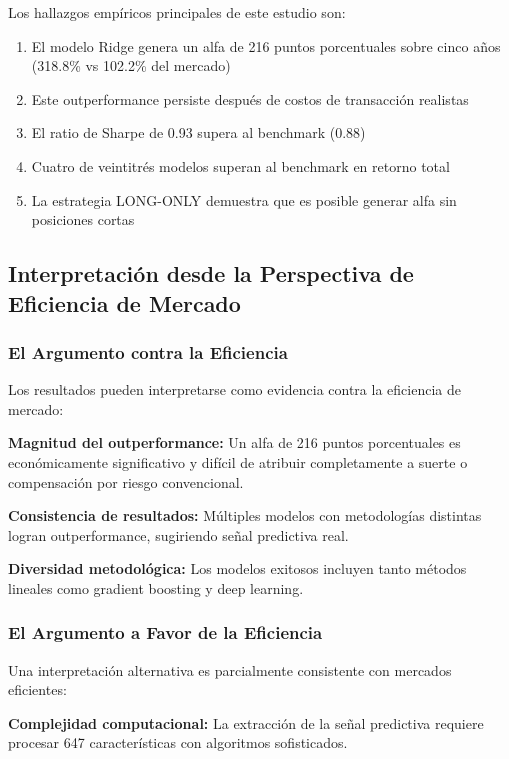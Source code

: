 \documentclass[11pt,a4paper]{article}
\begin{document}
Los hallazgos emp\'iricos principales de este estudio son:

\begin{enumerate}[noitemsep]
    \item El modelo Ridge genera un alfa de 216 puntos porcentuales sobre cinco a\~nos (318.8\% vs 102.2\% del mercado)
    \item Este outperformance persiste despu\'es de costos de transacci\'on realistas
    \item El ratio de Sharpe de 0.93 supera al benchmark (0.88)
    \item Cuatro de veintitr\'es modelos superan al benchmark en retorno total
    \item La estrategia LONG-ONLY demuestra que es posible generar alfa sin posiciones cortas
\end{enumerate}

\subsection{Interpretaci\'on desde la Perspectiva de Eficiencia de Mercado}

\subsubsection{El Argumento contra la Eficiencia}

Los resultados pueden interpretarse como evidencia contra la eficiencia de mercado:

\textbf{Magnitud del outperformance:} Un alfa de 216 puntos porcentuales es econ\'omicamente significativo y dif\'icil de atribuir completamente a suerte o compensaci\'on por riesgo convencional.

\textbf{Consistencia de resultados:} M\'ultiples modelos con metodolog\'ias distintas logran outperformance, sugiriendo se\~nal predictiva real.

\textbf{Diversidad metodol\'ogica:} Los modelos exitosos incluyen tanto m\'etodos lineales como gradient boosting y deep learning.

\subsubsection{El Argumento a Favor de la Eficiencia}

Una interpretaci\'on alternativa es parcialmente consistente con mercados eficientes:

\textbf{Complejidad computacional:} La extracci\'on de la se\~nal predictiva requiere procesar 647 caracter\'isticas con algoritmos sofisticados.
\end{document}

